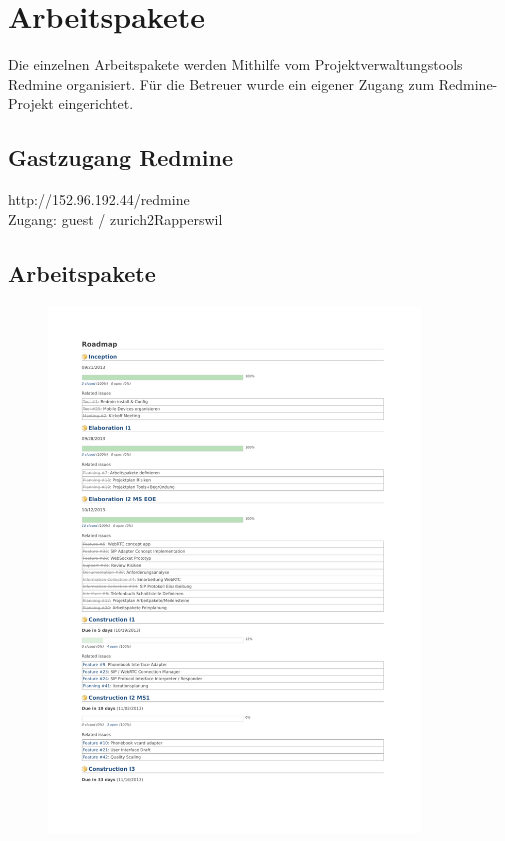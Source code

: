 \chapter{Arbeitspakete}
Die einzelnen Arbeitspakete werden Mithilfe vom Projektverwaltungstools Redmine organisiert. Für die Betreuer wurde ein eigener Zugang zum Redmine-Projekt eingerichtet.

\section{Gastzugang Redmine}
http://152.96.192.44/redmine \\
Zugang: guest / zurich2Rapperswil \\

\section{Arbeitspakete}
	\begin{figure}[H]
		\includegraphics[trim=1.75cm 2cm 2cm 2.5cm, clip=true,page=1,width=0.88\textwidth]{media/roadmap.pdf}
	\end{figure}

